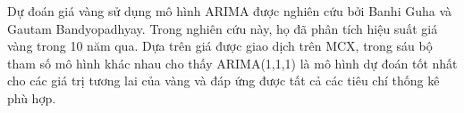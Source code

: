 Dự đoán giá vàng sử dụng mô hình ARIMA được nghiên cứu bởi Banhi Guha và Gautam Bandyopadhyay\cite{article2}. Trong nghiên cứu này, họ đã phân tích hiệu suất giá vàng trong 10 năm qua. Dựa trên giá được giao dịch trên MCX, trong sáu bộ tham số mô hình khác nhau cho thấy ARIMA(1,1,1) là mô hình dự đoán tốt nhất cho các giá trị tương lai của vàng và đáp ứng được tất cả các tiêu chí thống kê phù hợp.